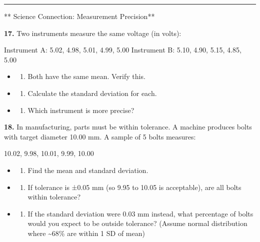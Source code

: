 \documentclass[
  11pt,
]{article}
\providecommand{\tightlist}{%
  \setlength{\itemsep}{0pt}\setlength{\parskip}{0pt}}
\begin{document}
\begin{center}\rule{0.5\linewidth}{0.5pt}\end{center}

** Science Connection: Measurement Precision**

\textbf{17.} Two instruments measure the same voltage (in volts):

Instrument A: 5.02, 4.98, 5.01, 4.99, 5.00 Instrument B: 5.10, 4.90,
5.15, 4.85, 5.00

\begin{itemize}
\item
  \begin{enumerate}
  \def\labelenumi{(\alph{enumi})}
  \tightlist
  \item
    Both have the same mean. Verify this.
  \end{enumerate}
\item
  \begin{enumerate}
  \def\labelenumi{(\alph{enumi})}
  \setcounter{enumi}{1}
  \tightlist
  \item
    Calculate the standard deviation for each.
  \end{enumerate}
\item
  \begin{enumerate}
  \def\labelenumi{(\alph{enumi})}
  \setcounter{enumi}{2}
  \tightlist
  \item
    Which instrument is more precise?
  \end{enumerate}
\end{itemize}

\textbf{18.} In manufacturing, parts must be within tolerance. A machine
produces bolts with target diameter 10.00 mm. A sample of 5 bolts
measures:

10.02, 9.98, 10.01, 9.99, 10.00

\begin{itemize}
\item
  \begin{enumerate}
  \def\labelenumi{(\alph{enumi})}
  \tightlist
  \item
    Find the mean and standard deviation.
  \end{enumerate}
\item
  \begin{enumerate}
  \def\labelenumi{(\alph{enumi})}
  \setcounter{enumi}{1}
  \tightlist
  \item
    If tolerance is ±0.05 mm (so 9.95 to 10.05 is acceptable), are all
    bolts within tolerance?
  \end{enumerate}
\item
  \begin{enumerate}
  \def\labelenumi{(\alph{enumi})}
  \setcounter{enumi}{2}
  \tightlist
  \item
    If the standard deviation were 0.03 mm instead, what percentage of
    bolts would you expect to be outside tolerance? (Assume normal
    distribution where \textasciitilde68\% are within 1 SD of mean)
  \end{enumerate}
\end{itemize}
\end{document}
